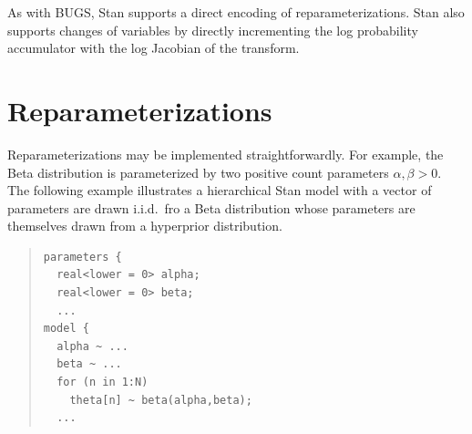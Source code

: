 \noindent
As with BUGS, Stan supports a direct encoding of reparameterizations.
Stan also supports changes of variables by directly incrementing the
log probability accumulator with the log Jacobian of the transform.

\section{Reparameterizations}

Reparameterizations may be implemented straightforwardly.  For
example, the Beta distribution is parameterized by two positive count
parameters $\alpha, \beta > 0$.  The following example illustrates a
hierarchical Stan model with a vector of parameters  are
drawn i.i.d.\ fro a Beta distribution whose parameters are themselves
drawn from a hyperprior distribution.
%
\begin{quote}
\begin{Verbatim}
parameters {
  real<lower = 0> alpha;
  real<lower = 0> beta;
  ...
model {
  alpha ~ ...
  beta ~ ...
  for (n in 1:N)
    theta[n] ~ beta(alpha,beta);
  ...
\end{Verbatim}
\end{quote}

